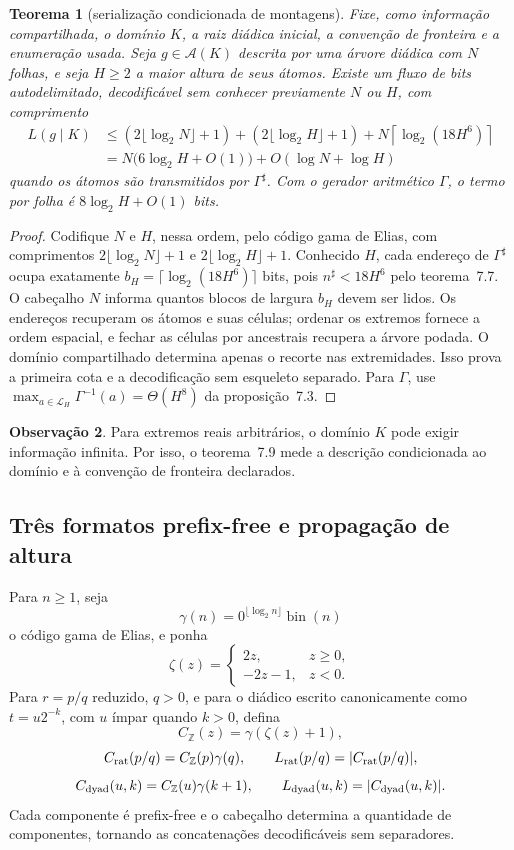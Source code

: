 \documentclass[11pt,a4paper]{article}
\theoremstyle{preciso}
\newtheorem{teorema}{Teorema}[section]
\theoremstyle{definition}
\newtheorem{observacao}[teorema]{Observação}
\newcommand{\Z}{\mathbb Z}
\newcommand{\LL}{\mathcal L}
\newcommand{\Asm}{\mathcal A}
\newcommand{\eqn}[2]{\begin{equation}\label{eq:#1}#2\end{equation}}
\begin{document}
\begin{teorema}[serialização condicionada de montagens]
Fixe, como informação compartilhada, o domínio $K$, a raiz diádica inicial, a convenção de fronteira e a enumeração usada. Seja $g\in\Asm(K)$ descrita por uma árvore diádica com $N$ folhas, e seja $H\ge2$ a maior altura de seus átomos. Existe um fluxo de bits autodelimitado, decodificável sem conhecer previamente $N$ ou $H$, com comprimento
\eqn{55}{\begin{aligned}
L(g\mid K)&\le(2\lfloor\log_2N\rfloor+1)+(2\lfloor\log_2H\rfloor+1)
+N\left\lceil\log_2(18H^6)\right\rceil\\
&=N\bigl(6\log_2H+O(1)\bigr)+O(\log N+\log H)
\end{aligned}}
quando os átomos são transmitidos por $\Gamma^\sharp$. Com o gerador aritmético $\Gamma$, o termo por folha é $8\log_2H+O(1)$ bits.
\end{teorema}
\begin{proof}
Codifique $N$ e $H$, nessa ordem, pelo código gama de Elias, com comprimentos $2\lfloor\log_2N\rfloor+1$ e $2\lfloor\log_2H\rfloor+1$. Conhecido $H$, cada endereço de $\Gamma^\sharp$ ocupa exatamente $b_H=\lceil\log_2(18H^6)\rceil$ bits, pois $n^\sharp<18H^6$ pelo teorema~7.7. O cabeçalho $N$ informa quantos blocos de largura $b_H$ devem ser lidos. Os endereços recuperam os átomos e suas células; ordenar os extremos fornece a ordem espacial, e fechar as células por ancestrais recupera a árvore podada. O domínio compartilhado determina apenas o recorte nas extremidades. Isso prova a primeira cota e a decodificação sem esqueleto separado. Para $\Gamma$, use $\max_{a\in\LL_H}\Gamma^{-1}(a)=\Theta(H^8)$ da proposição~7.3.
\end{proof}
\begin{observacao}
Para extremos reais arbitrários, o domínio $K$ pode exigir informação infinita. Por isso, o teorema~7.9 mede a descrição condicionada ao domínio e à convenção de fronteira declarados.
\end{observacao}

\subsection{Três formatos prefix-free e propagação de altura}
Para $n\ge1$, seja
\[
\gamma(n)=0^{\lfloor\log_2n\rfloor}\operatorname{bin}(n)
\]
o código gama de Elias, e ponha
\[
\zeta(z)=\begin{cases}2z,&z\ge0,\\-2z-1,&z<0.\end{cases}
\]
Para $r=p/q$ reduzido, $q>0$, e para o diádico escrito canonicamente como $t=u2^{-k}$, com $u$ ímpar quando $k>0$, defina
\eqn{56}{C_{\Z}(z)=\gamma(\zeta(z)+1),}
\eqn{57}{C_{\rm rat}(p/q)=C_{\Z}(p)\gamma(q),\qquad L_{\rm rat}(p/q)=|C_{\rm rat}(p/q)|,}
\eqn{58}{C_{\rm dyad}(u,k)=C_{\Z}(u)\gamma(k+1),\qquad L_{\rm dyad}(u,k)=|C_{\rm dyad}(u,k)|.}
Cada componente é prefix-free e o cabeçalho determina a quantidade de componentes, tornando as concatenações decodificáveis sem separadores.
\end{document}
